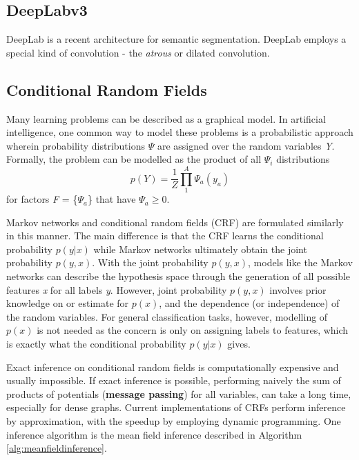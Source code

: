 \documentclass[journal]{IEEEtran}
\begin{document}
\subsection{DeepLabv3}
DeepLab\cite{DBLP:journals/corr/ChenPSA17} is a recent architecture for semantic segmentation. DeepLab employs a special kind of convolution - the \textit{atrous} or dilated convolution. 


\subsection{Conditional Random Fields}
Many learning problems can be described as a graphical model. In artificial intelligence, one common way to model these problems is a probabilistic approach wherein probability distributions \textit{$\Psi$} are assigned over the random variables \textit{Y}. Formally, the problem can be modelled as the product of all \textit{$\Psi_i$} distributions
\begin{equation}
p(Y) = \frac{1}{Z}\prod_1^A \Psi_a(y_a)
\end{equation}
for factors \textit{F} = \{$\Psi_a$\} that have $\Psi_a \geq 0$. 
 
Markov networks and conditional random fields (CRF) are formulated similarly in this manner. The main difference is that the CRF learns the conditional probability $p(y|x)$ while Markov networks ultimately obtain the joint probability $p(y,x)$. With the joint probability $p(y,x)$, models like the Markov networks can describe the hypothesis space through the generation of all possible features \textit{x} for all labels \textit{y}. However, joint probability $p(y,x)$ involves prior knowledge on or estimate for $p(x)$, and the dependence (or independence) of the random variables. For general classification tasks, however, modelling of $p(x)$ is not needed as the concern is only on assigning labels to features, which is exactly what the conditional probability $p(y|x)$ gives.

Exact inference on conditional random fields is computationally expensive and usually impossible. If exact inference is possible, performing naively the sum of products of potentials (\textbf{message passing}) for all variables, can take a long time, especially for dense graphs. Current implementations of CRFs perform inference by approximation, with the speedup by employing dynamic programming. One inference algorithm is the mean field inference described in Algorithm \ref{alg:meanfieldinference}.
\end{document}
